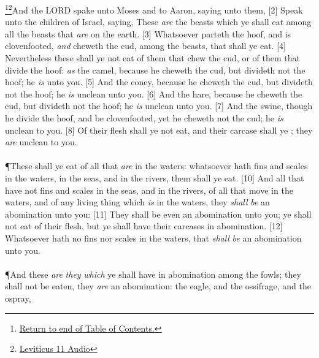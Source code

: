 \footnote{\textcolor[cmyk]{0.99998,1,0,0}{\hyperlink{TOC}{Return to end of Table of Contents.}}}\footnote{\href{https://audiobible.com/bible/leviticus_11.html}{\textcolor[cmyk]{0.99998,1,0,0}{Leviticus 11 Audio}}}\textcolor[cmyk]{0.99998,1,0,0}{And the LORD spake unto Moses and to Aaron, saying unto them,}
[2] \textcolor[cmyk]{0.99998,1,0,0}{Speak unto the children of Israel, saying, These \emph{are} the beasts which ye shall eat among all the beasts that \emph{are} on the earth.}
[3] \textcolor[cmyk]{0.99998,1,0,0}{Whatsoever parteth the hoof, and is clovenfooted, \emph{and} cheweth the cud, among the beasts, that shall ye eat.}
[4] \textcolor[cmyk]{0.99998,1,0,0}{Nevertheless these shall ye not eat of them that chew the cud, or of them that divide the hoof: \emph{as} the camel, because he cheweth the cud, but divideth not the hoof; he \emph{is}  unto you.}
[5] \textcolor[cmyk]{0.99998,1,0,0}{And the coney, because he cheweth the cud, but divideth not the hoof; he \emph{is} unclean unto you.}
[6] \textcolor[cmyk]{0.99998,1,0,0}{And the hare, because he cheweth the cud, but divideth not the hoof; he \emph{is} unclean unto you.}
[7] \textcolor[cmyk]{0.99998,1,0,0}{And the swine, though he divide the hoof, and be clovenfooted, yet he cheweth not the cud; he \emph{is} unclean to you.}
[8] \textcolor[cmyk]{0.99998,1,0,0}{Of their flesh shall ye not eat, and their carcase shall ye ; they \emph{are} unclean to you.}\\
\\
\P \textcolor[cmyk]{0.99998,1,0,0}{These shall ye eat of all that \emph{are} in the waters: whatsoever hath fins and scales in the waters, in the seas, and in the rivers, them shall ye eat.}
[10] \textcolor[cmyk]{0.99998,1,0,0}{And all that have not fins and scales in the seas, and in the rivers, of all that move in the waters, and of any living thing which \emph{is} in the waters, they \emph{shall} \emph{be} an abomination unto you:}
[11] \textcolor[cmyk]{0.99998,1,0,0}{They shall be even an abomination unto you; ye shall not eat of their flesh, but ye shall have their carcases in abomination.}
[12] \textcolor[cmyk]{0.99998,1,0,0}{Whatsoever hath no fins nor scales in the waters, that \emph{shall} \emph{be} an abomination unto you.}\\
\\
\P \textcolor[cmyk]{0.99998,1,0,0}{And these \emph{are} \emph{they} \emph{which} ye shall have in abomination among the fowls; they shall not be eaten, they \emph{are} an abomination: the eagle, and the ossifrage, and the ospray,}
